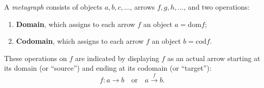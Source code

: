 A \emph{metagraph} consists of objects $a, b, c, \ldots$, arrows $f, g, h, \ldots$, and two operations:

\begin{enumerate}
\item \textbf{Domain}, which assigns to each arrow $f$ an object $a = \text{dom} f$;
\item \textbf{Codomain}, which assigns to each arrow $f$ an object $b = \text{cod} f$.
\end{enumerate}

These operations on $f$ are indicated by displaying $f$ as an actual arrow starting at its domain (or ``source'') and ending at its codomain (or ``target''):
$$f: a \rightarrow b \quad \text{or} \quad a \xrightarrow{f} b.$$

